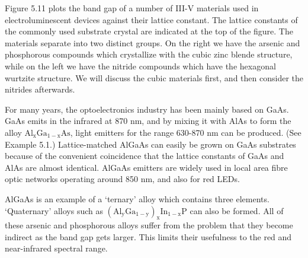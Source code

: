 \documentclass[12pt]{book}
\begin{document}
Figure 5.11 plots the band gap of a number of III-V materials used in electroluminescent devices against their lattice constant. The lattice constants of the commonly used substrate crystal are indicated at the top of the figure. The materials separate into two distinct groups. On the right we have the arsenic and phosphorous compounds which crystallize with the cubic zinc blende structure, while on the left we have the nitride compounds which have the hexagonal wurtzite structure. We will discuss the cubic materials first, and then consider the nitrides afterwards.

For many years, the optoelectronics industry has been mainly based on GaAs. GaAs emits in the infrared at 870 nm, and by mixing it with AlAs to form the alloy $\mathrm{Al_xGa_{1-x}As}$, light emitters for the range 630-870 nm can be produced. (See Example 5.1.) Lattice-matched AlGaAs can easily be grown on GaAs substrates because of the convenient coincidence that the lattice constants of GaAs and AlAs are almost identical. AlGaAs emitters are widely used in local area fibre optic networks operating around 850 nm, and also for red LEDs.

AlGaAs is an example of a `ternary' alloy which contains three elements. `Quaternary' alloys such as $\mathrm{(Al_yGa_{1-y})_xIn_{1-x}P}$ can also be formed. All of these arsenic and phosphorous alloys suffer from the problem that they become indirect as the band gap gets larger. This limits their usefulness to the red and near-infrared spectral range.
\end{document}
